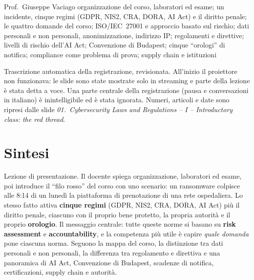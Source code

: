   {Prof.~Giuseppe Vaciago}
  {organizzazione del corso, laboratori ed esame; un incidente, cinque regimi (GDPR, NIS2, CRA, DORA,
   AI Act) e il diritto penale; le quattro domande del corso; ISO/IEC~27001 e approccio basato sul
   rischio; dati personali e non personali, anonimizzazione, indirizzo IP; regolamenti e direttive;
   livelli di rischio dell'AI Act; Convenzione di Budapest; cinque ``orologi'' di notifica; compliance
   come problema di prova; supply chain e istituzioni}
\label{lez:2026-09-21}

\begin{nota}[Fonte]
Trascrizione automatica della registrazione, revisionata. All'inizio il proiettore non funzionava: le
slide sono state mostrate solo in streaming e parte della lezione è stata detta a voce. Una parte
centrale della registrazione (pausa e conversazioni in italiano) è inintelligibile ed è stata
ignorata. Numeri, articoli e date sono ripresi dalle slide \emph{01.~Cybersecurity Laws and
Regulations -- I -- Introductory class: the red thread}.
\end{nota}

\section{Sintesi}
Lezione di presentazione. Il docente spiega organizzazione, laboratori ed esame, poi introduce il
``filo rosso'' del corso con uno scenario: un ransomware colpisce alle 8:14 di un lunedì la piattaforma
di prenotazione di una rete ospedaliera. Lo stesso fatto attiva \textbf{cinque regimi} (GDPR, NIS2,
CRA, DORA, AI Act) più il diritto penale, ciascuno con il proprio bene protetto, la propria autorità e
il proprio \textbf{orologio}. Il messaggio centrale: tutte queste norme si basano su \textbf{risk
assessment} e \textbf{accountability}, e la competenza più utile è capire \emph{quale domanda} pone
ciascuna norma. Seguono la mappa del corso, la distinzione tra dati personali e non personali, la
differenza tra regolamento e direttiva e una panoramica di AI Act, Convenzione di Budapest, scadenze di
notifica, certificazioni, supply chain e autorità.

